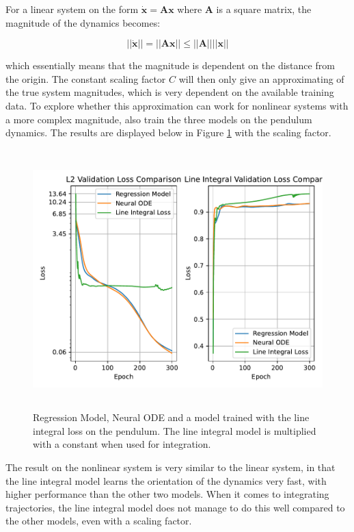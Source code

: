 \documentclass[12pt,a4paper]{book}
\begin{document}
For a linear system on the form $\dot{\bm{x}} = \bm{A} \bm{x}$ where $\bm{A}$ is a square matrix, the magnitude of the dynamics becomes:

\begin{equation*}
    || \dot{\bm{x}} || = ||\bm{A} \bm{x}|| \leq ||\bm{A}|| ||\bm{x}||
\end{equation*}

\noindent which essentially means that the magnitude is dependent on the distance from the origin. The constant scaling factor $C$ will then only give an approximating of the true system magnitudes, which is very dependent on the available training data. To explore whether this approximation can work for nonlinear systems with a more complex magnitude, also train the three models on the pendulum dynamics. The results are displayed below in Figure \ref{fig:line_integral_comparison_with_k_pendulum} with the scaling factor.

\begin{figure}[H]
    \centering
    \includegraphics[height=10cm]{figs/plots/motion_classification/line_integral_comparison_with_k_pendulum.pdf}
    \caption{Regression Model, Neural ODE and a model trained with the line integral loss on the pendulum. The line integral model is multiplied with a constant when used for integration.}
    \label{fig:line_integral_comparison_with_k_pendulum}
\end{figure}

The result on the nonlinear system is very similar to the linear system, in that the line integral model learns the orientation of the dynamics very fast, with higher performance than the other two models. When it comes to integrating trajectories, the line integral model does not manage to do this well compared to the other models, even with a scaling factor.
\end{document}

